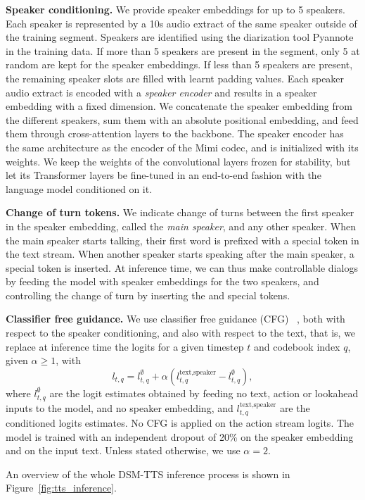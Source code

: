 \textbf{Speaker conditioning.} 
We provide speaker embeddings for up to 5 speakers.
Each speaker is represented by a 10s audio extract of the same speaker outside of the training segment. Speakers are identified using the diarization tool Pyannote~\citep{Bredin23} in the training data. If more than 5 speakers are present in the segment, only 5 at random are kept for the speaker embeddings. If less than 5 speakers are present, the remaining speaker slots are filled with learnt padding values. Each speaker audio extract is encoded with a \emph{speaker encoder} and results in a speaker embedding with a fixed dimension. We concatenate the speaker embedding from the different speakers, sum them with an absolute positional embedding, and feed them through cross-attention layers to the backbone. The speaker encoder has the same architecture as the encoder of the Mimi codec, and is initialized with its weights. We keep the weights of the convolutional layers frozen for stability, but let its Transformer layers be fine-tuned in an end-to-end fashion with the language model conditioned on it. 

\textbf{Change of turn tokens.}
We indicate change of turns between the first speaker in the speaker embedding, called the \emph{main speaker}, and any other speaker. When the main speaker starts talking, their first word is prefixed with a special  token in the text stream. When another speaker starts speaking after the main speaker, a special  token is inserted.
At inference time, we can thus make controllable dialogs by feeding the model with speaker embeddings for the two speakers, and controlling the change of turn by inserting the  and  special tokens.

\textbf{Classifier free guidance.}
We use classifier free guidance (CFG) ~\citep{ho2022classifier,audiogen}, both with respect to the speaker conditioning, and also with respect to the text, that is, we replace at inference time the logits for a given timestep $t$ and codebook index $q$, given $\alpha \geq 1$, with
\begin{equation}
\label{eq:cfg}
    l_{t, q} = l^{\emptyset}_{t, q} + \alpha \left(
    l^{\text{text,speaker}}_{t, q} - 
    l^{\emptyset}_{t, q}
    \right),
\end{equation}
where $l^{\emptyset}_{t, q}$ are the logit estimates obtained by feeding no text, action or lookahead inputs to the model, and no speaker embedding, and 
$l^{\text{text,speaker}}_{t, q}$ are the conditioned logits estimates.
No CFG is applied on the action stream logits. The model is trained with an independent dropout of 20\% on the speaker embedding and on the input text. Unless stated otherwise, we use $\alpha = 2$.

An overview of the whole DSM-TTS inference process is shown in Figure~\ref{fig:tts_inference}.
